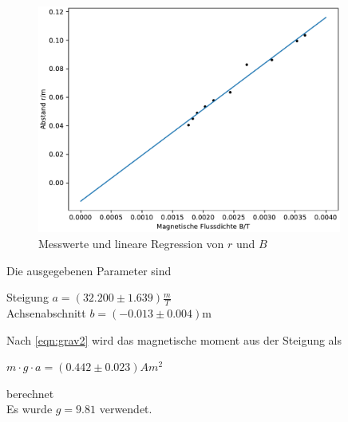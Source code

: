 \begin{figure}
  \centering
  \includegraphics[width = 10cm]{plot1.pdf}
  \caption{Messwerte und lineare Regression von $r$ und $B$}
  \label{fig:plot1}
\end{figure}

Die ausgegebenen Parameter sind\\
\begin{centering}
  Steigung $a = (32.200 ± 1.639) \frac{m}{T}$\\
  Achsenabschnitt $b = (-0.013 ± 0.004)$m\\
\end{centering}

Nach \ref{eqn:grav2} wird das magnetische moment aus der Steigung als\\
\begin{centering}
  $m \cdot g \cdot a = (0.442 \pm 0.023) Am^2$\\
\end{centering}
berechnet\\
Es wurde $g = 9.81$ verwendet. %
\newpage

